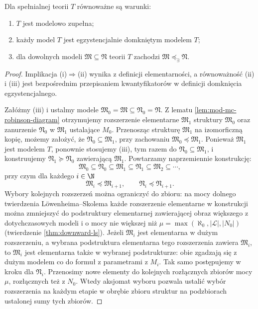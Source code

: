 \begin{twierdzenie}
\label{thm:mod-mc-robinson}
Dla spełnialnej teorii $T$ równoważne są warunki:
\begin{enumerate}[label=(\roman*)]
\item $T$ jest modelowo zupełna;
\item każdy model $T$ jest egzystencjalnie domkniętym
modelem $T$;
\item dla dowolnych modeli $\mathfrak M\subseteq\mathfrak N$
teorii $T$ zachodzi $\mathfrak M\preccurlyeq_{\exists}\mathfrak N$.
\end{enumerate}
\end{twierdzenie}
\begin{proof}
Implikacja (i)$\Rightarrow$(ii) wynika z definicji
elementarności, a równoważność (ii) i (iii) jest
bezpośrednim przepisaniem kwantyfikatorów w definicji
domknięcia egzystencjalnego.

Załóżmy (iii) i ustalmy modele
$\mathfrak M_0=\mathfrak M\subseteq\mathfrak N_0=\mathfrak N$.
Z lematu \ref{lem:mod-mc-robinson-diagram} otrzymujemy
rozszerzenie elementarne $\mathfrak M_1$ struktury
$\mathfrak M_0$ oraz zanurzenie $\mathfrak N_0$ w
$\mathfrak M_1$ ustalające $M_0$. Przenosząc strukturę
$\mathfrak M_1$ na izomorficzną kopię, możemy założyć,
że $\mathfrak N_0\subseteq\mathfrak M_1$, przy zachowaniu
$\mathfrak M_0\preccurlyeq\mathfrak M_1$.
Ponieważ $\mathfrak M_1$ jest modelem $T$, ponownie
stosujemy (iii), tym razem do
$\mathfrak N_0\subseteq\mathfrak M_1$, i konstruujemy
$\mathfrak N_1\succeq\mathfrak N_0$ zawierającą
$\mathfrak M_1$. Powtarzamy naprzemiennie konstrukcję:
\[
\mathfrak M_0\subseteq\mathfrak N_0
\subseteq\mathfrak M_1\subseteq\mathfrak N_1
\subseteq\mathfrak M_2\subseteq\cdots,
\]
przy czym dla każdego $i\in\N$
\[
\mathfrak M_i\preccurlyeq\mathfrak M_{i+1},
\qquad
\mathfrak N_i\preccurlyeq\mathfrak N_{i+1}.
\]
Wybory kolejnych rozszerzeń można ograniczyć do
zbioru: na mocy dolnego twierdzenia Löwenheima--Skolema
każde rozszerzenie elementarne w konstrukcji można
zmniejszyć do podstruktury elementarnej zawierającej
obraz większego z dotychczasowych modeli i o mocy
nie większej niż
$\mu=\max(\aleph_0,|\mathcal L|,|N_0|)$
(twierdzenie \ref{thm:downward-ls}).
Jeżeli $\mathfrak M_i$ jest elementarna w dużym
rozszerzeniu, a wybrana podstruktura elementarna
tego rozszerzenia zawiera $\mathfrak M_i$, to
$\mathfrak M_i$ jest elementarna także w wybranej
podstrukturze: obie zgadzają się z dużym modelem
co do formuł z parametrami z $M_i$.
Tak samo postępujemy w kroku dla $\mathfrak N_i$.
Przenosimy nowe elementy do kolejnych rozłącznych
zbiorów mocy $\mu$, rozłącznych też z $N_0$.
Wtedy aksjomat wyboru pozwala ustalić wybór rozszerzenia
na każdym etapie w obrębie zbioru struktur
na podzbiorach ustalonej sumy tych zbiorów.


\end{proof}
